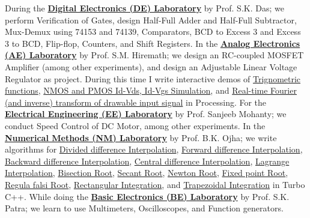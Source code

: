 During the \textbf{\href{https://github.com/nitrece/digital-electronics-laboratory}{Digital Electronics (DE) Laboratory}} by Prof. S.K. Das; we perform Verification of Gates, design Half-Full Adder and Half-Full Subtractor, Mux-Demux using 74153 and 74139, Comparators, BCD to Excess 3 and Excess 3 to BCD, Flip-flop, Counters, and Shift Registers. In the \textbf{\href{https://github.com/nitrece/analog-electronics-laboratory}{Analog Electronics (AE) Laboratory}} by Prof. S.M. Hiremath; we design an RC-coupled MOSFET Amplifier (among other experiments), and design an Adjustable Linear Voltage Regulator as project. During this time I write interactive demos of \href{https://github.com/processingf/trigonometry_graphs}{Trignometric functions}, \href{https://github.com/processingf/mosfet_sim}{NMOS and PMOS Id-Vds, Id-Vgs Simulation}, and \href{https://github.com/processingf/fourier_transform}{Real-time Fourier (and inverse) transform of drawable input signal} in Processing. For the \textbf{\href{https://github.com/nitrece/electrical-engineering-laboratory}{Electrical Engineering (EE) Laboratory}} by Prof. Sanjeeb Mohanty; we conduct Speed Control of DC Motor, among other experiments. In the \textbf{\href{https://github.com/nitrece/numerical-methods-laboratory}{Numerical Methods (NM) Laboratory}} by Prof. B.K. Ojha; we write algorithms for \href{https://github.com/cppf/divided-difference-interpolation}{Divided difference Interpolation}, \href{https://github.com/cppf/forward-difference-interpolation}{Forward difference Interpolation}, \href{https://github.com/cppf/backward-difference-interpolation}{Backward difference Interpolation}, \href{https://github.com/cppf/central-difference-interpolation}{Central difference Interpolation}, \href{https://github.com/cppf/lagrange-interpolation}{Lagrange Interpolation}, \href{https://github.com/cppf/bisection-root}{Bisection Root}, \href{https://github.com/cppf/secant-root}{Secant Root}, \href{https://github.com/cppf/newton-root}{Newton Root}, \href{https://github.com/cppf/fixed-point-root}{Fixed point Root}, \href{https://github.com/cppf/regula-falsi-root}{Regula falsi Root}, \href{https://github.com/cppf/rectangular-integration}{Rectangular Integration}, and \href{https://github.com/cppf/trapezoidal-integration}{Trapezoidal Integration} in Turbo C++. While doing the \textbf{\href{https://github.com/nitrece/basic-electronics-laboratory}{Basic Electronics (BE) Laboratory}} by Prof. S.K. Patra; we learn to use Multimeters, Oscilloscopes, and Function generators.

